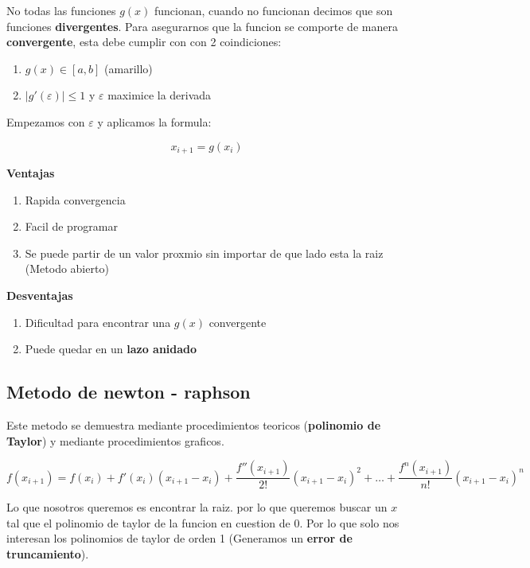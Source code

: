 \documentclass[10pt]{article}
\begin{document}
No todas las funciones $g(x)$ funcionan, cuando no funcionan decimos
que son funciones \textbf{divergentes}. Para asegurarnos que la funcion
se comporte de manera \textbf{convergente}, esta debe cumplir con con 2 coindiciones:

\begin{enumerate}
	\item $g(x) \in [a, b]$ (amarillo)
	\item $|g'(\varepsilon)| \leq 1$ y $\varepsilon$ maximice la derivada
\end{enumerate}

Empezamos con $\varepsilon$ y aplicamos la formula:

\begin{equation}
	x_{i+1} = g(x_i)
\end{equation}

\textbf{Ventajas}

\begin{enumerate}
	\item Rapida convergencia
	\item Facil de programar
	\item Se puede partir de un valor proxmio sin importar de que lado esta la raiz (Metodo abierto)
\end{enumerate}

\textbf{Desventajas}

\begin{enumerate}
	\item Dificultad para encontrar una $g(x)$ convergente
	\item Puede quedar en un \textbf{lazo anidado}
\end{enumerate}

\subsection{Metodo de newton - raphson}

Este metodo se demuestra mediante procedimientos teoricos 
(\textbf{polinomio de Taylor}) y mediante procedimientos graficos.

\begin{equation}
	f(x_{i+1}) = f(x_i) + f'(x_i)(x_{i+1}-x_i) + \dfrac{f''(x_{i+1})}{2!}(x_{i+1}-x_i)^2 + \dots + \dfrac{f^n (x_{i+1})}{n!}(x_{i+1}-x_i)^n
\end{equation}

Lo que nosotros queremos es encontrar la raiz. por lo que queremos buscar
un $x$ tal que el polinomio de taylor de la funcion en cuestion de $0$.
Por lo que solo nos interesan los polinomios de taylor de orden 1 
(Generamos un \textbf{error de truncamiento}).
\end{document}
